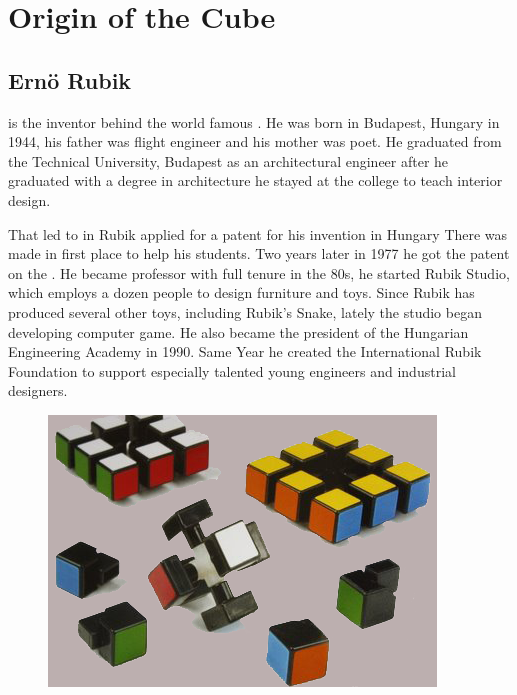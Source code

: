 \chapter{Origin of the Cube}

\section{Ern\"{o} Rubik}
\erno{} is the inventor behind the world famous \rubik{}. He was born in Budapest, Hungary in 1944, his father was flight engineer and his mother was poet. He graduated from the Technical University, Budapest as an architectural engineer after he graduated with a degree in architecture he stayed at the college to teach interior design.

That led to in  Rubik applied for a patent for his invention in Hungary There was made in first place to help his students. Two years later in 1977 he got the patent on the \mcube{}.
He became professor with full tenure in the 80s, he started Rubik Studio, which employs a dozen people to design furniture and toys. 
Since Rubik has produced several other toys, including Rubik's Snake, lately the studio began developing computer game. He also became the president of the Hungarian Engineering Academy in 1990. Same Year he created the International Rubik Foundation to support especially talented young engineers and industrial designers.

\begin{figure}
	\centering
		\includegraphics[scale=0.8]{input/pics/rubiks-cube.png}
	\caption{}
	\label{fig:rubiks-cube}
\end{figure}
 
